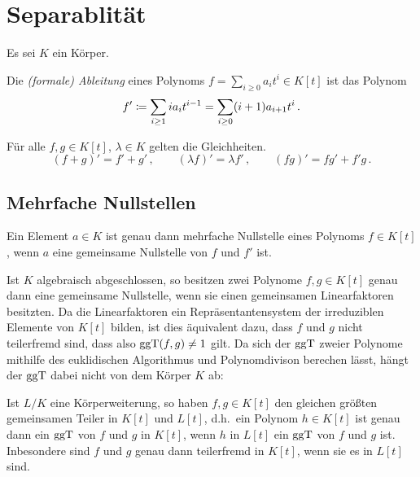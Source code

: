 \pagebreak










\section{Separablität}

Es sei $K$ ein Körper.

\begin{definition}
  Die \emph{\textup(formale\textup) Ableitung} eines Polynoms $f = \sum_{i \geq 0} a_i t^i \in K[t]$ ist das Polynom
  \[
              f'
    \coloneqq  \sum_{i \geq 1} i a_i t^{i-1}
    =         \sum_{i \geq 0} (i+1) a_{i+1} t^i \,.
  \]
\end{definition}

\begin{lemma}
  Für alle $f, g \in K[t]$, $\lambda \in K$ gelten die Gleichheiten.
  \[
    (f + g)' = f' + g' \,,
    \qquad
    (\lambda f)' = \lambda f' \,,
    \qquad
    (fg)' = fg' + f'g \,.
  \]

\end{lemma}



\subsection{Mehrfache Nullstellen}

\begin{lemma}
  Ein Element $a \in K$ ist genau dann mehrfache Nullstelle eines Polynoms $f \in K[t]$, wenn $a$ eine gemeinsame Nullstelle von $f$ und $f'$ ist.
\end{lemma}

Ist $K$ algebraisch abgeschlossen, so besitzen zwei Polynome $f, g \in K[t]$ genau dann eine gemeinsame Nullstelle, wenn sie einen gemeinsamen Linearfaktoren besitzten.
Da die Linearfaktoren ein Repräsentantensystem der irreduziblen Elemente von $K[t]$ bilden, ist dies äquivalent dazu, dass $f$ und $g$ nicht teilerfremd sind, dass also $\operatorname{ggT}(f,g) \neq 1$ gilt.
Da sich der $\operatorname{ggT}$ zweier Polynome mithilfe des euklidischen Algorithmus und Polynomdivison berechen lässt, hängt der $\operatorname{ggT}$ dabei nicht von dem Körper $K$ ab:

\begin{lemma}
  Ist $L/K$ eine Körperweiterung, so haben $f, g \in K[t]$ den gleichen größten gemeinsamen Teiler in $K[t]$ und $L[t]$, d.h.\ ein Polynom $h \in K[t]$ ist genau dann ein $\operatorname{ggT}$ von $f$ und $g$ in $K[t]$, wenn $h$ in $L[t]$ ein $\operatorname{ggT}$ von $f$ und $g$ ist.
  Inbesondere sind $f$ und $g$ genau dann teilerfremd in $K[t]$, wenn sie es in $L[t]$ sind.
\end{lemma}

